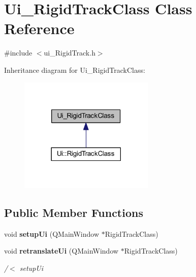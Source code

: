 \section{Ui\+\_\+\+Rigid\+Track\+Class Class Reference}
\label{class_ui___rigid_track_class}


{\ttfamily \#include $<$ui\+\_\+\+Rigid\+Track.\+h$>$}



Inheritance diagram for Ui\+\_\+\+Rigid\+Track\+Class\+:\nopagebreak
\begin{figure}[H]
\begin{center}
\leavevmode
\includegraphics[width=182pt]{class_ui___rigid_track_class__inherit__graph}
\end{center}
\end{figure}
\subsection*{Public Member Functions}
\begin{DoxyCompactItemize}
\item 
void \textbf{ setup\+Ui} (Q\+Main\+Window $\ast$Rigid\+Track\+Class)
\item 
void \textbf{ retranslate\+Ui} (Q\+Main\+Window $\ast$Rigid\+Track\+Class)
\begin{DoxyCompactList}\small\item\em /$<$ setup\+Ui \end{DoxyCompactList}\end{DoxyCompactItemize}
